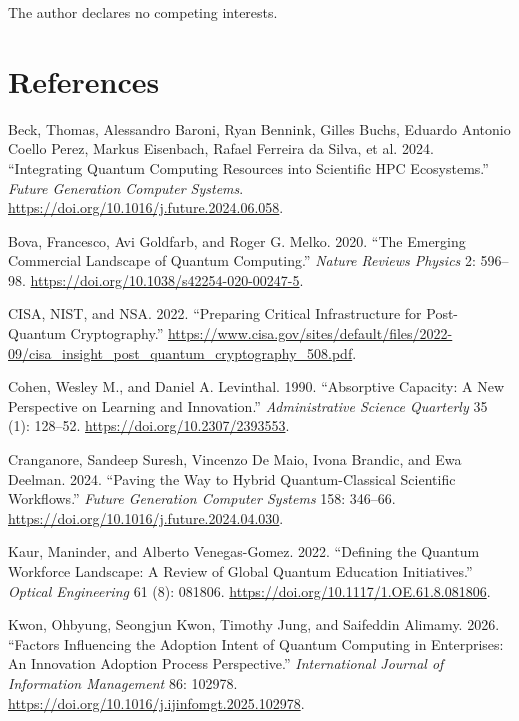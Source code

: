 \documentclass[
  11pt,
  letterpaper,
]{article}
\newlength{\cslhangindent}
\newenvironment{CSLReferences}[2] %
 {\begin{list}{}{%
  \setlength{\itemindent}{0pt}
  \setlength{\leftmargin}{0pt}
  \setlength{\parsep}{0pt}
  \ifodd #1
   \setlength{\leftmargin}{\cslhangindent}
   \setlength{\itemindent}{-1\cslhangindent}
  \fi
  \setlength{\itemsep}{#2\baselineskip}}}
 {\end{list}}
\begin{document}
The author declares no competing interests.

\section{References}\label{references}

\label{refs}
\begin{CSLReferences}{1}{0}
Beck, Thomas, Alessandro Baroni, Ryan Bennink, Gilles Buchs, Eduardo
Antonio Coello Perez, Markus Eisenbach, Rafael Ferreira da Silva, et al.
2024. {``Integrating Quantum Computing Resources into Scientific HPC
Ecosystems.''} \emph{Future Generation Computer Systems}.
\url{https://doi.org/10.1016/j.future.2024.06.058}.

Bova, Francesco, Avi Goldfarb, and Roger G. Melko. 2020. {``The Emerging
Commercial Landscape of Quantum Computing.''} \emph{Nature Reviews
Physics} 2: 596--98. \url{https://doi.org/10.1038/s42254-020-00247-5}.

CISA, NIST, and NSA. 2022. {``Preparing Critical Infrastructure for
Post-Quantum Cryptography.''}
\url{https://www.cisa.gov/sites/default/files/2022-09/cisa_insight_post_quantum_cryptography_508.pdf}.

Cohen, Wesley M., and Daniel A. Levinthal. 1990. {``Absorptive Capacity:
A New Perspective on Learning and Innovation.''} \emph{Administrative
Science Quarterly} 35 (1): 128--52.
\url{https://doi.org/10.2307/2393553}.

Cranganore, Sandeep Suresh, Vincenzo De Maio, Ivona Brandic, and Ewa
Deelman. 2024. {``Paving the Way to Hybrid Quantum-Classical Scientific
Workflows.''} \emph{Future Generation Computer Systems} 158: 346--66.
\url{https://doi.org/10.1016/j.future.2024.04.030}.

Kaur, Maninder, and Alberto Venegas-Gomez. 2022. {``Defining the Quantum
Workforce Landscape: A Review of Global Quantum Education
Initiatives.''} \emph{Optical Engineering} 61 (8): 081806.
\url{https://doi.org/10.1117/1.OE.61.8.081806}.

Kwon, Ohbyung, Seongjun Kwon, Timothy Jung, and Saifeddin Alimamy. 2026.
{``Factors Influencing the Adoption Intent of Quantum Computing in
Enterprises: An Innovation Adoption Process Perspective.''}
\emph{International Journal of Information Management} 86: 102978.
\url{https://doi.org/10.1016/j.ijinfomgt.2025.102978}.


\end{CSLReferences}
\end{document}
